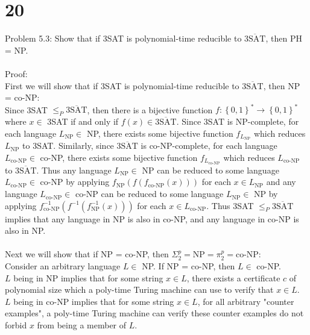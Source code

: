 \documentclass[letterpaper,notitlepage,twoside]{article}
\begin{document}
\section*{20}
Problem 5.3: Show that if 3SAT is polynomial-time reducible to $\overline{\text{3SAT}}$, then PH = NP.
\\\\
Proof:\\
First we will show that if 3SAT is polynomial-time reducible to $\overline{\text{3SAT}}$, then NP = co-NP:\\
Since 3SAT $\le_P \overline{\text{3SAT}}$, then there is a bijective function $f: \left\{ 0,1 \right\}^* \rightarrow \left\{ 0,1 \right\}^*$ where $x \in $ 3SAT if and only if $f(x) \in \overline{\text{3SAT}}$. Since 3SAT is NP-complete, for each language $L_{\text{NP}} \in$ NP, there exists some bijective function $f_{L_{\text{NP}}}$ which reduces $L_{\text{NP}}$ to 3SAT. Similarly, since $\overline{\text{3SAT}}$ is co-NP-complete, for each language $L_{\text{co-NP}} \in$ co-NP, there exists some bijective function $f_{L_{\text{co-NP}}}$ which reduces $L_{\text{co-NP}}$ to $\overline{\text{3SAT}}$. Thus any language $L_{\text{NP}} \in $ NP can be reduced to some language $L_{\text{co-NP}} \in$ co-NP by applying $f_{\text{NP}}(f(f_{\text{co-NP}}(x)))$ for each $x \in L_{\text{NP}}$ and any language $L_{\text{co-NP}} \in $ co-NP can be reduced to some language $L_{\text{NP}} \in$ NP by applying $f^{-1}_{\text{co-NP}}(f^{-1}(f^{-1}_{\text{NP}}(x)))$ for each $x \in L_{\text{co-NP}}$. Thus 3SAT $\le_P \overline{\text{3SAT}}$ implies that any language in NP is also in co-NP, and any language in co-NP is also in NP. 
\\\\
Next we will show that if NP = co-NP, then $\Sigma_2^p = \text{NP} = \pi_2^p = \text{co-NP}$:\\
Consider an arbitrary language $L \in$ NP. If NP = co-NP, then $L \in$ co-NP.\\
$L$ being in NP implies that for some string $x \in L$, there exists a certificate $c$ of polynomial size which a poly-time Turing machine can use to verify that $x \in L$. \\
$L$ being in co-NP implies that for some string $x \in L$, for all arbitrary "counter examples", a poly-time Turing machine can verify these counter examples do not forbid $x$ from being a member of $L$. \\
\end{document}
